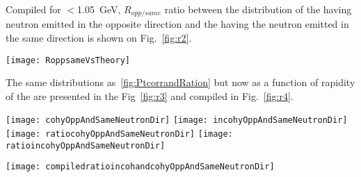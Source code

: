     Compiled for \pt$<$1.05~GeV, $R_{opp/same}$ ratio between the \pt 
      distribution of the \JPsi having neutron emitted in the opposite 
      direction and  the \JPsi having the neutron emitted in the same
      direction is shown on Fig.~\ref{fig:r2}. 
    \begin{figure*}[!Hhtb]
      \begin{center}
        \texttt{[image: RoppsameVsTheory]}
        \caption{ \label{fig:r2} Ratio between the transverse momentum 
          distribution of the $J/\psi$ when  $J/\psi$ and neutron have 
          the opposite direction and the transverse momentum distribution 
          of the $J/\psi$ when  $J/\psi$ and neutron have the same direction.}
      \end{center}
    \end{figure*}
    The same distributions as~\ref{fig:PtcorrandRation} but now as a function 
      of rapidity of the \JPsi are presented in the Fig~\ref{fig:r3} and 
      compiled in Fig.~\ref{fig:r4}. 
    
    \begin{figure*}[!Hhtb]
      \begin{center}
        \texttt{[image: cohyOppAndSameNeutronDir]}
        \texttt{[image: incohyOppAndSameNeutronDir]}\\
        \texttt{[image: ratiocohyOppAndSameNeutronDir]}
        \texttt{[image: ratioincohyOppAndSameNeutronDir]}
        \caption{ \label{fig:r3} Rapidity distribution of the $J/\psi$ when  
          $J/\psi$ and neutron have the opposite rapidity direction and the 
          rapidity distribution of the $J/\psi$ when  $J/\psi$ and neutron 
          have the same rapidity direction for low-\pt (top left) and high-\pt 
          (top right) \JPsi. Bottom: Ratios $R_{opp/same}$ for low-\pt ( left) 
          and high-\pt ( right) \JPsi.}
      \end{center}
    \end{figure*}
    
    \begin{figure*}[!Hhtb]
      \begin{center}
        \texttt{[image: compiledratioincohandcohyOppAndSameNeutronDir]}
        \caption{ \label{fig:r4} Rapidity ratios $R_{opp/same}$ for low-\pt 
          ( left) and high-\pt ( right) \JPsi.}
      \end{center}
    \end{figure*}
    
